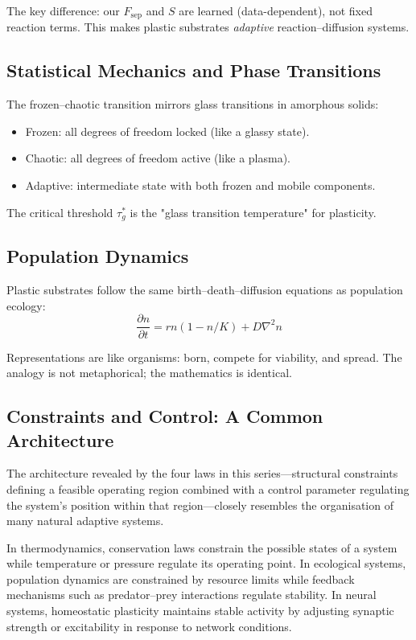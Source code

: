 \documentclass[11pt]{article}
\begin{document}
The key difference: our $F_{\text{sep}}$ and $S$ are learned (data-dependent), not fixed reaction terms. This makes plastic substrates \emph{adaptive} reaction--diffusion systems.

\subsection{Statistical Mechanics and Phase Transitions}

The frozen--chaotic transition mirrors glass transitions in amorphous solids:
\begin{itemize}
\item Frozen: all degrees of freedom locked (like a glassy state).
\item Chaotic: all degrees of freedom active (like a plasma).
\item Adaptive: intermediate state with both frozen and mobile components.
\end{itemize}

The critical threshold $\tau_g^*$ is the "glass transition temperature" for plasticity.

\subsection{Population Dynamics}

Plastic substrates follow the same birth--death--diffusion equations as population ecology:
\begin{equation}
\frac{\partial n}{\partial t} = r n (1 - n/K) + D \nabla^2 n
\end{equation}

Representations are like organisms: born, compete for viability, and spread. The analogy is not metaphorical; the mathematics is identical.

\subsection{Constraints and Control: A Common Architecture}

The architecture revealed by the four laws in this series---structural constraints defining a feasible operating region combined with a control parameter regulating the system's position within that region---closely resembles the organisation of many natural adaptive systems.

In thermodynamics, conservation laws constrain the possible states of a system while temperature or pressure regulate its operating point. In ecological systems, population dynamics are constrained by resource limits while feedback mechanisms such as predator--prey interactions regulate stability. In neural systems, homeostatic plasticity maintains stable activity by adjusting synaptic strength or excitability in response to network conditions.
\end{document}
